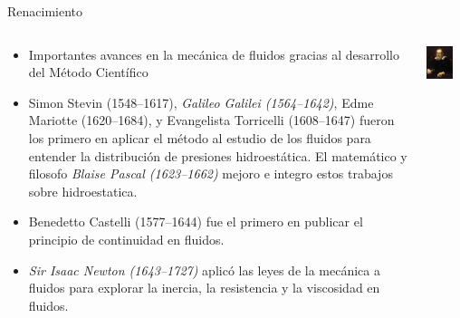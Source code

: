 \documentclass [xcolor=svgnames, t] {beamer}
\begin{document}
\begin{frame}{Renacimiento}
\begin{columns}
\vspace{-0.5cm}
\begin{exampleblock}{}
\begin{itemize}
\item Importantes avances en la mecánica de fluidos gracias al desarrollo del Método Científico
\item Simon Stevin (1548–1617), \emph{Galileo Galilei (1564–1642)}, Edme Mariotte (1620–1684), y Evangelista Torricelli (1608–1647) fueron los primero en aplicar el método al estudio de los fluidos para entender la distribución de presiones hidroestática. El matemático y filosofo \emph{Blaise Pascal (1623–1662)} mejoro e integro estos trabajos sobre hidroestatica.
\item Benedetto Castelli (1577–1644) fue el primero en publicar el principio de continuidad en fluidos.
\item \emph{Sir Isaac Newton (1643–1727)} aplic\'o las leyes de la mecánica a fluidos para explorar la inercia, la resistencia y la  viscosidad en fluidos.
\end{itemize}
\end{exampleblock}
\vspace{-0.4cm}
\begin{center}
\includegraphics[width=0.7\textwidth]{gali}\\

\end{center}
\end{columns}
\end{frame}
\end{document}
